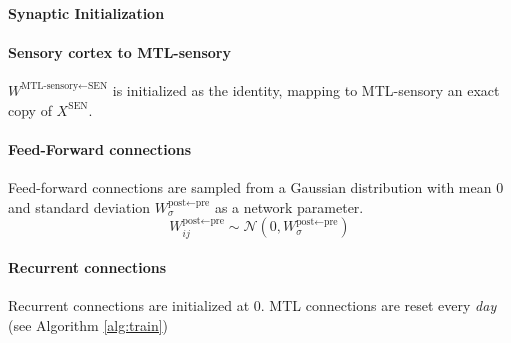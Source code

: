 \documentclass{article}
\begin{document}
\paragraph{Synaptic Initialization}
\paragraph{Sensory cortex to MTL-sensory}
$W^{\textrm{MTL-sensory}\leftarrow\textrm{SEN}}$ is initialized as the identity, mapping to MTL-sensory an exact copy of $X^\textrm{SEN}$.
\paragraph{Feed-Forward connections}
Feed-forward connections are sampled from a Gaussian distribution with mean 0 and standard deviation $W^{\textrm{post}\leftarrow\textrm{pre}}_\sigma$ as a network parameter.
\begin{equation}
    W^{\textrm{post}\leftarrow\textrm{pre}}_{ij} \sim \mathcal{N}(0, W^{\textrm{post}\leftarrow\textrm{pre}}_\sigma)
\end{equation}
\paragraph{Recurrent connections}
Recurrent connections are initialized at 0. MTL connections are reset every \textit{day} (see Algorithm \ref{alg:train})
\end{document}
